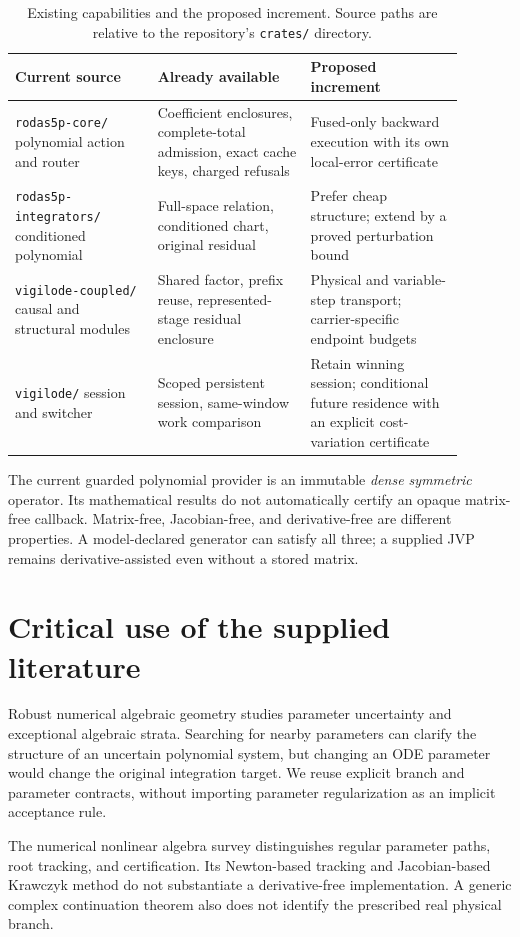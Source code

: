 \documentclass[aps,pra,reprint,onecolumn,11pt,notitlepage,nofootinbib]{revtex4-2}
\begin{document}
\begin{table}[h]
\caption{Existing capabilities and the proposed increment. Source paths are
relative to the repository's \texttt{crates/} directory.}
\begin{tabular}{L{0.29\linewidth}L{0.30\linewidth}L{0.30\linewidth}}
\toprule
Current source & Already available & Proposed increment\\
\midrule
\texttt{rodas5p-core/} polynomial action and router & Coefficient enclosures,
complete-total admission, exact cache keys, charged refusals & Fused-only
backward execution with its own local-error certificate\\
\texttt{rodas5p-integrators/} conditioned polynomial & Full-space relation,
conditioned chart, original residual & Prefer cheap structure; extend by a
proved perturbation bound\\
\texttt{vigilode-coupled/} causal and structural modules & Shared factor,
prefix reuse, represented-stage residual enclosure & Physical and
variable-step transport; carrier-specific endpoint budgets\\
\texttt{vigilode/} session and switcher & Scoped persistent session,
same-window work comparison & Retain winning session; conditional future
residence with an explicit cost-variation certificate\\
\bottomrule
\end{tabular}
\end{table}

The current guarded polynomial provider is an immutable \emph{dense symmetric}
operator. Its mathematical results do not automatically certify an opaque
matrix-free callback. Matrix-free, Jacobian-free, and derivative-free are
different properties. A model-declared generator can satisfy all three;
a supplied JVP remains derivative-assisted even without a stored matrix.

\section{Critical use of the supplied literature}
Robust numerical algebraic geometry studies parameter uncertainty and
exceptional algebraic strata\cite{robust}. Searching for nearby parameters
can clarify the structure of an uncertain polynomial system, but changing
an ODE parameter would change the original integration target. We reuse
explicit branch and parameter contracts, without importing parameter
regularization as an implicit acceptance rule.

The numerical nonlinear algebra survey distinguishes regular parameter
paths, root tracking, and certification\cite{nonlinear}. Its Newton-based
tracking and Jacobian-based Krawczyk method do not substantiate a
derivative-free implementation. A generic complex continuation theorem also
does not identify the prescribed real physical branch.
\end{document}
